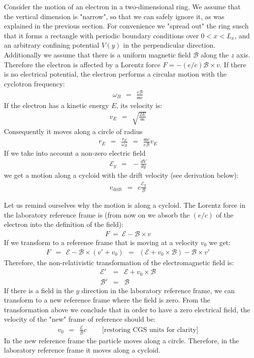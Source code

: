 \documentclass[onecolumn,fleqn]{revtex4}
\newcommand{\mass}{\mathsf{m}}
\newcommand{\beq}{\begin{eqnarray}}
\newcommand{\eeq}{\end{eqnarray}}
\begin{document}
Consider the motion of an electron in 
a two-dimensional ring. We assume that 
the vertical dimension is "narrow", 
so that we can safely ignore it, as was explained 
in the previous section. For convenience  
we "spread out" the ring susch that it forms a rectangle 
with periodic boundary conditions over ${0<x<L_x}$, 
and an arbitrary confining potential ${V(y)}$ 
in the perpendicular direction. 
Additionally we assume that there is a uniform 
magnetic field ${\mathcal{B}}$ along the $z$ axis. 
Therefore the electron is affected by 
a Lorentz force ${F = - (e/c) \mathcal{B} \times v}$. 
If there is no electrical potential, the electron 
performs a circular motion with the cyclotron frequency:
\beq
\omega_B \ \ = \ \ \frac{e\mathcal{B}}{\mass c} 
\eeq
If the electron has a kinetic energy ${E}$, its velocity is:
\beq
v_E \ \ = \ \ \sqrt{ \frac{2E}{\mass}} 
\eeq
Consequently it moves along a circle of radius
\beq
r_E \ \ = \ \ \frac{v_E}{\omega_B} \ \ = \ \ \frac{\mass c}{e\mathcal{B}}v_E 
\eeq
If we take into account a non-zero electric field
\beq
\mathcal{E}_y \ \  = \ \ -\frac{dV}{dy} 
\eeq
we get a motion along a cycloid with the 
drift velocity (see derivation below):
\beq
v_{\mbox{drift}} \ \ = \ \ c\frac{\mathcal{E}_y}{\mathcal{B}} 
\eeq



Let us remind ourselves why the motion is along 
a cycloid. The Lorentz force in the laboratory reference 
frame is (from now on we absorb the $(e/c)$
of the electron into the definition of the field):
\beq
F \ = \ \mathcal{E} - \mathcal{B} \times v 
\eeq
If we transform to a reference frame 
that is moving at a velocity ${v_0}$ we get:
\beq
F \ \ = \ \ \mathcal{E} - \mathcal{B} \times ( v' + v_0 ) 
\ \ = \ \ (\mathcal{E} + v_0 \times \mathcal{B}) - \mathcal{B} \times v' 
\eeq
Therefore, the non-relativistic transformation 
of the electromagnetic field is:
\beq
\mathcal{E}' &=& \mathcal{E} + v_0 \times \mathcal{B} 
\\ \nonumber
\mathcal{B}' &=& \mathcal{B} 
\eeq
If there is a field in the $y$ direction in the laboratory reference frame, 
we can transform to a new reference frame where the field is zero. 
From the transformation above we conclude that in order 
to have a zero electrical field, the velocity of the "new" 
frame of reference should be: 
\beq
v_0 \ \ = \ \ \frac{\mathcal{E}}{\mathcal{B}}c \ \ \ \ \ \ \ \ \ \ \text{[restoring CGS units for clarity]} 
\eeq
In the new reference frame the particle 
moves along a circle. Therefore, in the laboratory 
reference frame it moves along a cycloid. 
\end{document}
